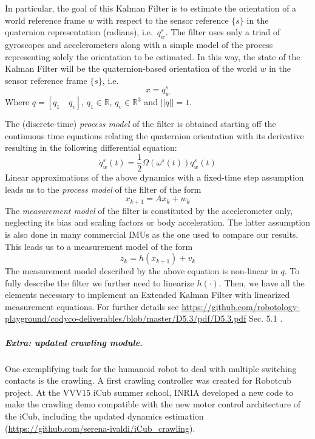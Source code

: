 In particular,
the goal of this Kalman Filter is to estimate the orientation of a world reference frame $w$ with respect to the sensor reference $\{s\}$ in the quaternion representation (radians), i.e.~$q^{s}_{w}$.  The filter uses only a triad of gyroscopes and accelerometers  along with a simple model of the process representing solely the orientation to be estimated. In this way, the state of the Kalman Filter will be the quaternion-based orientation of the world $w$ in the sensor reference frame $\{s\}$, i.e.
\begin{equation}
  x = q^{s}_{w}
\end{equation}
Where $q = [q_1 \quad q_v]$, $q_1 \in \mathbb{R}$, $q_v \in \mathbb{R}^3$ and $||q|| = 1$. 

The (discrete-time) \emph{process model} of the filter
 is obtained starting off the continuous time equations relating the quaternion orientation with its derivative resulting in the following differential equation:
 \begin{equation}
  \dot{q}^{s}_{w}(t) = \frac{1}{2}\Omega(\omega^{s}(t))q^{s}_{w}(t)
  \label{Eq:diffEq}
 \end{equation}
 Linear approximations of the above dynamics with a fixed-time step assumption leads us to the \emph{process model} of the filter of the form 
 \[x_{k+1} = Ax_k + w_k\]
The \emph{measurement model} of the filter is constituted by the accelerometer only, neglecting its bias and scaling factors or body acceleration. The latter assumption is also done in many commercial IMUs as the one used to compare our results. This leads us to a measurement model of the form
\[z_{k} = h(x_{k+1}) + v_{k}\]
 The measurement model described by the above equation is non-linear in $q$. To fully describe the filter we further need to linearize $h(\cdot)$. 
  Then, we have all the elements necessary to implement an Extended Kalman Filter with linearized measurement equations.
For further details see  \url{https://github.com/robotology-playground/codyco-deliverables/blob/master/D5.3/pdf/D5.3.pdf} Sec. 5.1 \cite{deliverable53}.


\subparagraph*{Extra: updated crawling module. }

One exemplifying task for the humanoid robot to deal with multiple switching contacts is the crawling. A first crawling controller was created for  Robotcub project. At the VVV15 iCub summer school, INRIA developed a new code to make the crawling demo compatible with the new motor control architecture of the iCub, including the updated dynamics estimation (\url{https://github.com/serena-ivaldi/iCub_crawling}).





